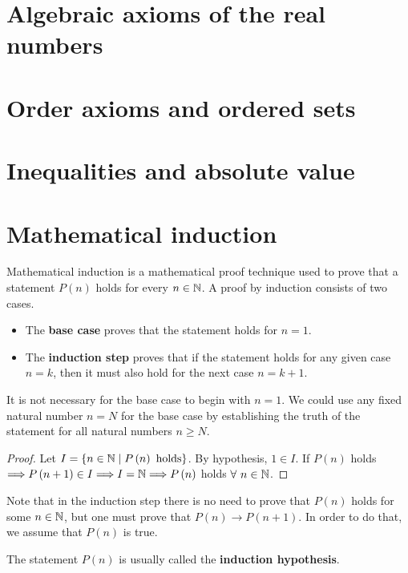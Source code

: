 
\section{Algebraic axioms of the real numbers}

\section{Order axioms and ordered sets}

\section{Inequalities and absolute value}

\section{Mathematical induction}
Mathematical induction is a mathematical proof technique used to prove that a statement $P\left( n \right)$
holds for every $n\in\mathbb{N}$. A proof by induction consists of two cases.
\begin{itemize}[itemsep = -2pt]
    \item The \textbf{base case} proves that the statement holds for $n = 1$.
    \item The \textbf{induction step} proves that if the statement holds for any given case $n = k$, then
        it must also hold for the next case $n = k + 1$.
\end{itemize}
It is not necessary for the base case to begin with $n = 1$. We could use any fixed natural number $n = N$
for the base case by establishing the truth of the statement for all natural numbers $n\geq N$.

\begin{proof}
    Let $I = \{n\in\mathbb{N}\; | \; P\left( n \right) \textrm{ holds}\} $. By hypothesis, $1\in I$. If $P\left( n \right) $ holds $\Longrightarrow P\left( n + 1 \right) \in I\Longrightarrow I = \mathbb{N}\Longrightarrow P\left( n \right) $ holds $\forall\ n\in
    \mathbb{N}$.
\end{proof}

Note that in the induction step there is no need to prove that $P\left( n \right) $ holds for some $n\in\mathbb{N}$,
but one must prove that $P\left( n \right) \longrightarrow P\left( n + 1 \right) $. In order to do that, we
assume that $P\left( n \right) $ is true.

\begin{note}
    The statement $P\left( n \right) $ is usually called the \textbf{induction hypothesis}.
\end{note}

